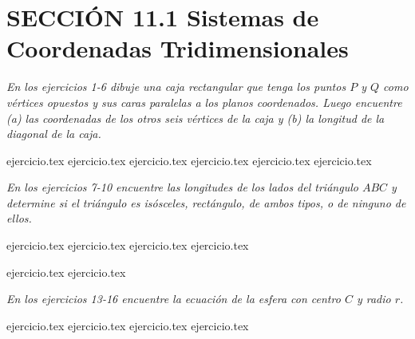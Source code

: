 
\section*{SECCIÓN 11.1 \quad Sistemas de Coordenadas Tridimensionales}

\noindent\textit{En los ejercicios 1-6 dibuje una caja rectangular que tenga los puntos $P$ y $Q$ como vértices opuestos y sus caras paralelas a los planos coordenados. Luego encuentre (a) las coordenadas de los otros seis vértices de la caja y (b) la longitud de la diagonal de la caja.}

\begin{enumerate}
    {ejercicio.tex}
{ejercicio.tex}
{ejercicio.tex}
{ejercicio.tex}
{ejercicio.tex}
{ejercicio.tex}
\end{enumerate}

\vspace{0.5cm}
\noindent\textit{En los ejercicios 7-10 encuentre las longitudes de los lados del triángulo $ABC$ y determine si el triángulo es isósceles, rectángulo, de ambos tipos, o de ninguno de ellos.}

\begin{enumerate}
    \setcounter{enumi}{6}
    {ejercicio.tex}
{ejercicio.tex}
{ejercicio.tex}
{ejercicio.tex}
\end{enumerate}

\vspace{0.3cm}
\begin{enumerate}
    \setcounter{enumi}{10}
    {ejercicio.tex}
{ejercicio.tex}
\end{enumerate}

\vspace{0.5cm}
\noindent\textit{En los ejercicios 13-16 encuentre la ecuación de la esfera con centro $C$ y radio $r$.}

\begin{enumerate}
    \setcounter{enumi}{12}
    {ejercicio.tex}
{ejercicio.tex}
{ejercicio.tex}
{ejercicio.tex}
\end{enumerate}


